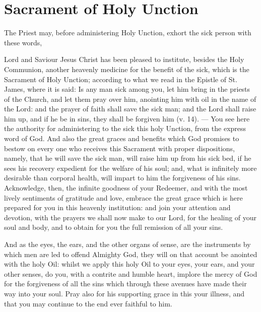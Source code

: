 \fancyhead[RE,LO]{\textit{}}
\section{Sacrament of Holy Unction}
\begin{secrubric}
    The Priest may, before administering Holy Unction, exhort the sick person with these words,
\end{secrubric}
 Lord and Saviour Jesus Christ has been pleased to institute, besides the Holy Communion, another heavenly medicine for the benefit of the sick, which is the Sacrament of %
Holy Unction; according to what we read in the Epistle of St. James, where it is said: Is any man sick among you, let him bring in the priests of the Church, and let them pray over him, anointing him with oil in the name of the Lord: and the prayer of faith shall save the sick man; and the Lord shall raise him up, and if he be in sins, they shall be forgiven him (v. 14). --- You see here the authority for administering to the sick this holy Unction, from the express word of God. And also the great graces and benefits which God promises to bestow on every one who receives this Sacrament with proper dispositions, namely, that he will save the sick man, will raise him up from his sick bed, if he sees his recovery expedient for the welfare of his soul; and, what is infinitely more desirable than corporal health, will impart to him the forgiveness of his sins. Acknowledge, then, the infinite goodness of your Redeemer, and with the most lively sentiments of gratitude and love, embrace the great grace which is here prepared for you in this heavenly institution: and join your attention and devotion, with the prayers we shall now make to our Lord, for the healing of your soul and body, and to obtain for you the full remission of all your sins.\par
And as the eyes, the ears, and the other organs of sense, are the instruments by which men are led to offend Almighty God, they will on that account be anointed with the holy Oil: whilst we apply this holy Oil to your eyes, your ears, and your other senses, do you, with a contrite and humble heart, implore the mercy of God for the forgiveness of all the sins which through these avenues have made their way into your soul. Pray also for his supporting grace in this your illness, and that you may continue to the end ever faithful to him.
